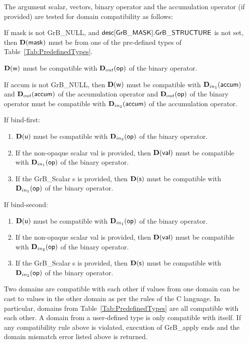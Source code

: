 The argument scalar, vectors, binary operator and the accumulation 
operator (if provided) are tested for domain compatibility as follows:
\begin{enumerate}
	\item If {\sf mask} is not {\sf GrB\_NULL}, and ${\sf desc[GrB\_MASK].GrB\_STRUCTURE}$
    is not set, then $\bold{D}({\sf mask})$ must be from one of the pre-defined types of 
    Table~\ref{Tab:PredefinedTypes}.

	\item $\bold{D}({\sf w})$ must be compatible with $\mbox{$\mathbf{D}_{out}$}({\sf op})$ of the binary operator.

	\item If {\sf accum} is not {\sf GrB\_NULL}, then $\bold{D}({\sf w})$ must be
    compatible with $\mbox{$\mathbf{D}_{in_{1}}$}({\sf accum})$ and $\mbox{$\mathbf{D}_{out}$}({\sf accum})$ of the accumulation operator and 
    $\mbox{$\mathbf{D}_{out}$}({\sf op})$ of the binary operator must be compatible with $\mbox{$\mathbf{D}_{in_{2}}$}({\sf accum})$ of the accumulation operator.

{\color{red}
	\item If bind-first:
	    \begin{enumerate}

		\item $\bold{D}({\sf u})$ must be compatible with $\mbox{$\mathbf{D}_{in_{2}}$}({\sf op})$ of the binary operator.
	    
		\item If the non-opaque scalar {\sf val} is provided, then $\bold{D}({\sf val})$ must be compatible with $\mbox{$\mathbf{D}_{in_{1}}$}({\sf op})$ of the binary operator.

		\item If the {\sf GrB\_Scalar} {\sf s} is provided, then $\bold{D}({\sf s})$ must be compatible with $\mbox{$\mathbf{D}_{in_{1}}$}({\sf op})$ of the binary operator.

	    \end{enumerate}

	\item If bind-second:
	    \begin{enumerate}

		\item $\bold{D}({\sf u})$ must be compatible with $\mbox{$\mathbf{D}_{in_{1}}$}({\sf op})$ of the binary operator.
	    
		\item If the non-opaque scalar {\sf val} is provided, then $\bold{D}({\sf val})$ must be compatible with $\mbox{$\mathbf{D}_{in_{2}}$}({\sf op})$ of the binary operator.

		\item If the {\sf GrB\_Scalar} {\sf s} is provided, then $\bold{D}({\sf s})$ must be compatible with $\mbox{$\mathbf{D}_{in_{2}}$}({\sf op})$ of the binary operator.

	    \end{enumerate}
}
\end{enumerate}
Two domains are compatible with each other if values from one domain can be cast 
to values in the other domain as per the rules of the C language.
In particular, domains from Table~\ref{Tab:PredefinedTypes} are all compatible 
with each other. A domain from a user-defined type is only compatible with itself.
If any compatibility rule above is violated, execution of {\sf GrB\_apply} ends
and the domain mismatch error listed above is returned.

